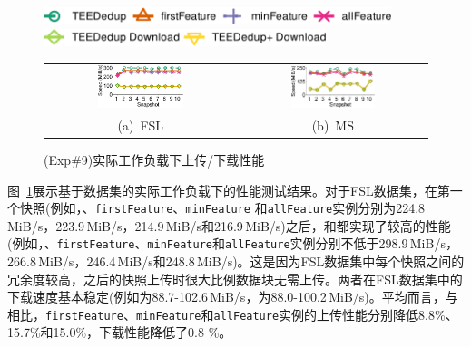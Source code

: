 \begin{figure}[!htb]
    \centering
    \includegraphics[height=0.2in]{pic/featurespy/plot/performance/LANTrace/trace_legend_upload.pdf}\\
    \includegraphics[height=0.2in]{pic/featurespy/plot/performance/LANTrace/trace_legend_download.pdf}\\
    \vspace{3pt}
    \begin{tabular}{@{\ }c@{\ }c}
        \includegraphics[width=0.47\textwidth]{pic/featurespy/plot/performance/LANTrace/trace_fsl.pdf}&
        \includegraphics[width=0.47\textwidth]{pic/featurespy/plot/performance/LANTrace/trace_ms.pdf}\\
        \mbox{\small (a) FSL} &
        \mbox{\small (b) MS}\\
    \end{tabular}
    \caption{(Exp\#9)实际工作负载下上传/下载性能}
    \label{fig:featurespy-traceDrivenThroughput}
\end{figure}

图~\ref{fig:featurespy-traceDrivenThroughput}展示基于数据集的实际工作负载下\prototype 的性能测试结果。对于FSL数据集，在第一个快照(例如，\sysnameS、{\tt firstFeature}、{\tt minFeature} 和{\tt allFeature}实例分别为224.8\,MiB/s，223.9\,MiB/s，214.9\,MiB/s和216.9\,MiB/s)之后，\sysnameS 和\prototype 都实现了较高的性能(例如，\sysnameS、{\tt firstFeature}、{\tt minFeature}和{\tt allFeature}实例分别不低于298.9\,MiB/s，266.8\,MiB/s，246.4\,MiB/s和248.8\,MiB/s)。这是因为FSL数据集中每个快照之间的冗余度较高，之后的快照上传时很大比例数据块无需上传。两者在FSL数据集中的下载速度基本稳定(例如\sysnameS 为88.7-102.6\,MiB/s，\prototype 为88.0-100.2\,MiB/s)。平均而言，与\sysnameS 相比，{\tt firstFeature}、{\tt minFeature}和{\tt allFeature}实例的上传性能分别降低8.8\%、15.7\%和15.0\%，下载性能降低了0.8 \%。

